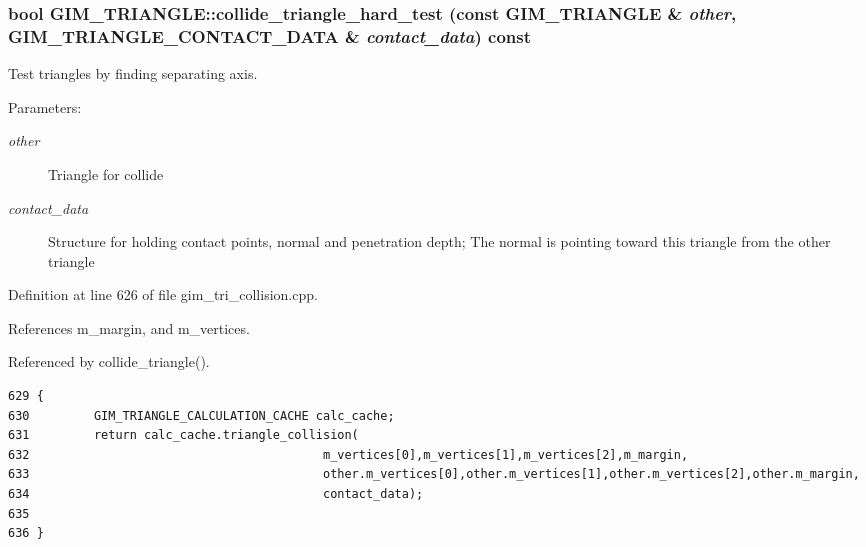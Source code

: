 \hypertarget{class_g_i_m___t_r_i_a_n_g_l_e_0ec3d21ba17dec3cfecbe8ff34b85072}{
\subsubsection[collide\_\-triangle\_\-hard\_\-test]{\setlength{\rightskip}{0pt plus 5cm}bool GIM\_\-TRIANGLE::collide\_\-triangle\_\-hard\_\-test (const {\bf GIM\_\-TRIANGLE} \& {\em other}, \/  {\bf GIM\_\-TRIANGLE\_\-CONTACT\_\-DATA} \& {\em contact\_\-data}) const}}
\label{class_g_i_m___t_r_i_a_n_g_l_e_0ec3d21ba17dec3cfecbe8ff34b85072}


Test triangles by finding separating axis. 

\begin{Desc}
\item[Parameters:]
\begin{description}
\item[{\em other}]Triangle for collide \item[{\em contact\_\-data}]Structure for holding contact points, normal and penetration depth; The normal is pointing toward this triangle from the other triangle \end{description}
\end{Desc}


Definition at line 626 of file gim\_\-tri\_\-collision.cpp.

References m\_\-margin, and m\_\-vertices.

Referenced by collide\_\-triangle().

\begin{Code}\begin{verbatim}629 {
630         GIM_TRIANGLE_CALCULATION_CACHE calc_cache;      
631         return calc_cache.triangle_collision(
632                                         m_vertices[0],m_vertices[1],m_vertices[2],m_margin,
633                                         other.m_vertices[0],other.m_vertices[1],other.m_vertices[2],other.m_margin,
634                                         contact_data);
635 
636 }
\end{verbatim}
\end{Code}




